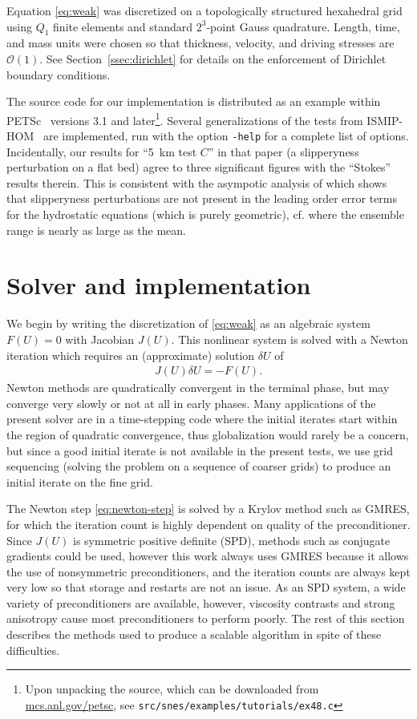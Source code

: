 \documentclass[3p]{elsarticle}
\newcommand{\bigO}{{\mathcal{O}}}
\begin{document}
Equation \eqref{eq:weak} was discretized on a topologically structured hexahedral grid using $Q_1$ finite elements and standard $2^3$-point Gauss quadrature.  Length, time, and mass units were chosen so that thickness, velocity, and driving stresses are $\bigO(1)$.  See Section~\ref{ssec:dirichlet} for details on the enforcement of Dirichlet boundary conditions.

The source code for our implementation is distributed as an example within PETSc~\cite{petsc-web-page} versions 3.1 and later\footnote{Upon unpacking the source, which can be downloaded from \href{http://mcs.anl.gov/petsc}{mcs.anl.gov/petsc}, see \texttt{src/snes/examples/tutorials/ex48.c}}.  Several generalizations of the tests from ISMIP-HOM~\cite{pattyn2008beh} are implemented, run with the option \texttt{-help} for a complete list of options.  Incidentally, our results for ``\SI{5}{\kilo\metre} test $C$'' in that paper (a slipperyness perturbation on a flat bed) agree to three significant figures with the ``Stokes'' results therein.  This is consistent with the asympotic analysis of \cite{schoof2010thin} which shows that slipperyness perturbations are not present in the leading order error terms for the hydrostatic equations (which is purely geometric), cf. \cite[Table~4 and Figure~8]{pattyn2008beh} where the ensemble range is nearly as large as the mean.

\section{Solver and implementation}\label{sec:solver}
We begin by writing the discretization of \eqref{eq:weak} as an algebraic system $F(U) = 0$ with
Jacobian $J(U)$.  This nonlinear system is solved with a Newton iteration which requires an
(approximate) solution $\delta U$ of
\begin{align}\label{eq:newton-step}
  J(U)\delta U = -F(U) .
\end{align}
Newton methods are quadratically convergent in the terminal phase, but may converge very slowly or
not at all in early phases.  Many applications of the present solver are in a time-stepping code
where the initial iterates start within the region of quadratic convergence, thus globalization
would rarely be a concern, but since a good initial iterate is not available in the present tests,
we use grid sequencing (solving the problem on a sequence of coarser grids) to produce an initial
iterate on the fine grid.

The Newton step \eqref{eq:newton-step} is solved by a Krylov method such as GMRES, for which the iteration count is highly dependent on quality of the preconditioner.  Since $J(U)$ is symmetric positive definite (SPD), methods such as conjugate gradients could be used, however this work always uses GMRES because it allows the use of nonsymmetric preconditioners, and the iteration counts are always kept very low so that storage and restarts are not an issue.  As an SPD system, a wide variety of preconditioners are available, however, viscosity contrasts and strong anisotropy cause most preconditioners to perform poorly.  The rest of this section describes the methods used to produce a scalable algorithm in spite of these difficulties.
\end{document}
